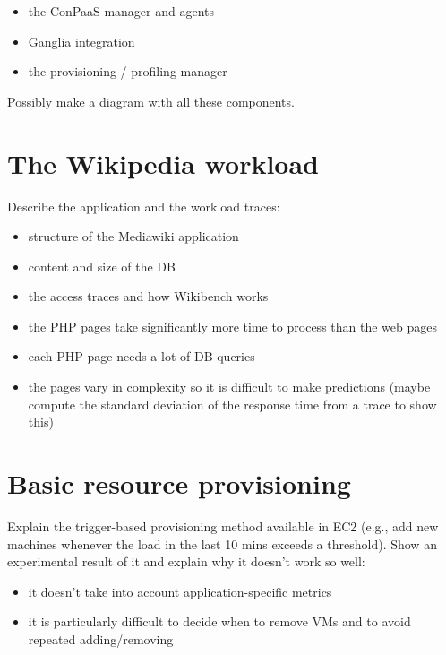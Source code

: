 \documentclass[10pt,twocolumn]{article}
\begin{document}
\begin{itemize}
\item the ConPaaS manager and agents
\item Ganglia integration
\item the provisioning / profiling manager
\end{itemize}

Possibly make a diagram with all these components.


\section*{The Wikipedia workload}

Describe the application and the workload traces: 


\begin{itemize}
\item structure of the Mediawiki application
\item content and size of the DB
\item the access traces and how Wikibench works
\end{itemize}

\begin{itemize}
\item the PHP pages take significantly more time to process
than the web pages
\item each PHP page needs a lot of DB queries 
\item the pages vary in complexity so it is difficult to make
predictions (maybe compute the standard deviation of the response time
from a trace to show this)
\end{itemize}

\section*{Basic resource provisioning}

Explain the trigger-based provisioning method available in EC2 (e.g., add new machines
whenever the load in the last 10 mins exceeds a threshold). Show an experimental result
of it and explain why it doesn't work so well:

\begin{itemize}
\item it doesn't take into account application-specific metrics
\item it is particularly difficult to decide when to remove VMs and to avoid
repeated adding/removing
\end{itemize}
\end{document}
